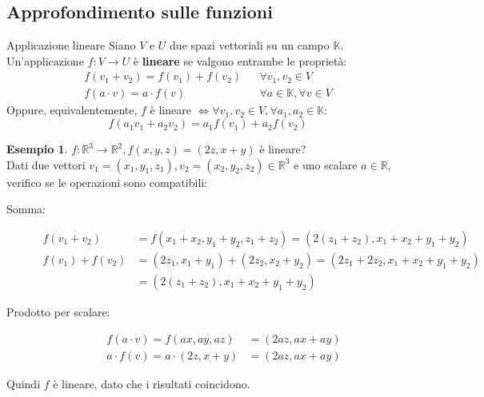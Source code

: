 \documentclass[a4paper]{article}
\theoremstyle{definition}
\newtheorem*{es}{Esempio}
\begin{document}
\subsection{Approfondimento sulle funzioni}
\begin{deff}{Applicazione lineare}{}
	Siano $V$ e $U$ due spazi vettoriali su un campo $\mathbb{K}$.
	Un'applicazione $f: V \rightarrow U$ è \textbf{lineare} se valgono entrambe le proprietà:
	\begin{align*}
		f(v_1 + v_2) = f(v_1) + f(v_2) &  & \forall v_1, v_2 \in V           \\
		f(a \cdot v) = a \cdot f(v)    &  & \forall a \in \mathbb{K}, \forall v \in V
	\end{align*}
	Oppure, equivalentemente, $f$ è lineare $\Leftrightarrow \forall v_1, v_2 \in V, \forall a_1, a_2 \in \mathbb{K}$:
	\begin{equation*}
		f(a_1v_1 + a_2v_2) = a_1f(v_1) + a_2f(v_2)
	\end{equation*}
\end{deff}
\begin{es}
	$f: \mathbb{R}^3 \rightarrow \mathbb{R}^2, f(x, y, z) = (2z, x + y)$ è lineare? \\
	Dati due vettori $v_1 = (x_1, y_1, z_1), v_2 = (x_2, y_2, z_2) \in \mathbb{R}^3$ e uno scalare $a \in \mathbb{R}$,
	verifico se le operazioni sono compatibili:
	\begin{description}
		\item[Somma:] 
		\begin{align*}
			f(v_1 + v_2)    & = f(x_1 + x_2, y_1 + y_2, z_1 + z_2) = (2(z_1 + z_2), x_1 + x_2 + y_1 + y_2)   \\
			f(v_1) + f(v_2) & = (2z_1, x_1 + y_1) + (2z_2, x_2 + y_2) = (2z_1 + 2z_2, x_1 + x_2 + y_1 + y_2) \\
							& = (2(z_1 + z_2), x_1 + x_2 + y_1 + y_2)
		\end{align*}
		\item[Prodotto per scalare:]
		\begin{align*}
			f(a \cdot v) = f(ax, ay, az)       & = (2az, ax + ay) \\
			a \cdot f(v) = a \cdot (2z, x + y) & = (2az, ax + ay)
		\end{align*}
	\end{description}
	Quindi $f$ è lineare, dato che i risultati coincidono.
\end{es}
\end{document}
